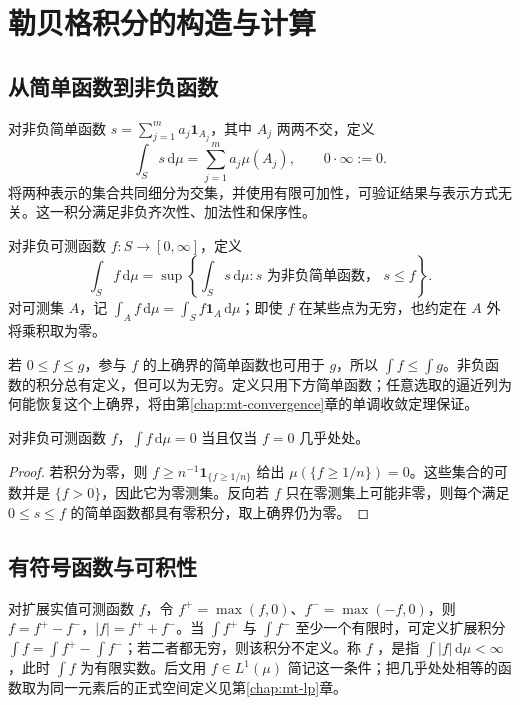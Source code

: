 \documentclass[UTF8,12pt,a4paper,fontset=fandol]{ctexbook}
\begin{document}
\chapter{勒贝格积分的构造与计算}
\label{chap:mt-integral}

\section{从简单函数到非负函数}
对非负简单函数 $s=\sum_{j=1}^{m}a_j\mathbf1_{A_j}$，其中 $A_j$ 两两不交，定义
\begin{equation}
 \int_Ss\,\mathrm d\mu=\sum_{j=1}^{m}a_j\mu(A_j),
 \qquad 0\cdot\infty:=0.
 \label{eq:mt-simple-integral}
\end{equation}
将两种表示的集合共同细分为交集，并使用有限可加性，可验证结果与表示方式无关。这一积分满足非负齐次性、加法性和保序性。

\begin{definition}
对非负可测函数 $f:S\to[0,\infty]$，定义
\begin{equation}
 \int_Sf\,\mathrm d\mu
 =\sup\left\{\int_Ss\,\mathrm d\mu:s\text{ 为非负简单函数， }s\leq f\right\}.
 \label{eq:mt-nonnegative-integral}
\end{equation}
对可测集 $A$，记 $\int_Af\,\mathrm d\mu=\int_Sf\mathbf1_A\,\mathrm d\mu$；即使 $f$ 在某些点为无穷，也约定在 $A$ 外将乘积取为零。
\end{definition}
若 $0\leq f\leq g$，参与 $f$ 的上确界的简单函数也可用于 $g$，所以 $\int f\leq\int g$。非负函数的积分总有定义，但可以为无穷。定义只用下方简单函数；任意选取的逼近列为何能恢复这个上确界，将由第\ref{chap:mt-convergence}章的单调收敛定理保证。

\begin{proposition}[零积分与几乎处处]
对非负可测函数 $f$，$\int f\,\mathrm d\mu=0$ 当且仅当 $f=0$ 几乎处处。
\label{prop:mt-zero-integral}
\end{proposition}
\begin{proof}
若积分为零，则 $f\geq n^{-1}\mathbf1_{\{f\geq1/n\}}$ 给出 $\mu(\{f\geq1/n\})=0$。这些集合的可数并是 $\{f>0\}$，因此它为零测集。反向若 $f$ 只在零测集上可能非零，则每个满足 $0\leq s\leq f$ 的简单函数都具有零积分，取上确界仍为零。
\end{proof}

\section{有符号函数与可积性}
对扩展实值可测函数 $f$，令 $f^+=\max(f,0)$、$f^-=\max(-f,0)$，则 $f=f^+-f^-$，$|f|=f^++f^-$。当 $\int f^+$ 与 $\int f^-$ 至少一个有限时，可定义扩展积分 $\int f=\int f^+-\int f^-$；若二者都无穷，则该积分不定义。称 $f$ ，是指 $\int|f|\,\mathrm d\mu<\infty$，此时 $\int f$ 为有限实数。后文用 $f\in L^1(\mu)$ 简记这一条件；把几乎处处相等的函数取为同一元素后的正式空间定义见第\ref{chap:mt-lp}章。
\end{document}
